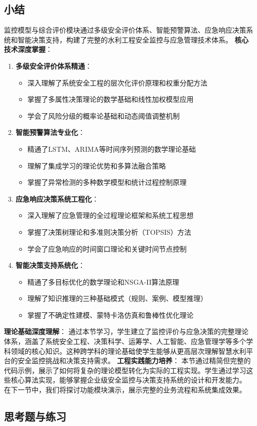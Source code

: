 \subsection{小结}\label{ux5c0fux7ed3-1} 监控模型与综合评价模块通过多级安全评价体系、智能预警算法、应急响应决策系统和智能决策支持，构建了完整的水利工程安全监控与应急管理技术体系。
\textbf{核心技术深度掌握}： \begin{enumerate} \def\labelenumi{\arabic{enumi}.} \tightlist \item \textbf{多级安全评价体系精通}：
\begin{itemize} \tightlist \item 深入理解了系统安全工程的层次化评价原理和权重分配方法 \item 掌握了多属性决策理论的数学基础和线性加权模型应用 \item 学会了风险分级的概率论基础和动态阈值调整机制
\end{itemize} \item \textbf{智能预警算法专业化}： \begin{itemize} \tightlist \item 精通了LSTM、ARIMA等时间序列预测的数学理论基础 \item
理解了集成学习的理论优势和多算法融合策略 \item 掌握了异常检测的多种数学模型和统计过程控制原理 \end{itemize} \item \textbf{应急响应决策系统工程化}： \begin{itemize} \tightlist
\item 深入理解了应急管理的全过程理论框架和系统工程思想 \item 掌握了决策树理论和多准则决策分析（TOPSIS）方法 \item 学会了应急响应的时间窗口理论和关键时间节点控制 \end{itemize} \item
\textbf{智能决策支持系统化}： \begin{itemize} \tightlist \item 精通了多目标优化的数学理论和NSGA-II算法原理 \item 理解了知识推理的三种基础模式（规则、案例、模型推理） \item
掌握了不确定性建模、蒙特卡洛仿真和鲁棒性优化理论 \end{itemize} \end{enumerate} \textbf{理论基础深度理解}：
通过本节学习，学生建立了监控评价与应急决策的完整理论体系，涵盖了系统安全工程、决策科学、运筹学、人工智能、应急管理学等多个学科领域的核心知识。这种跨学科的理论基础使学生能够从更高层次理解智慧水利平台的安全监控挑战和决策支持需求。
\textbf{工程实践能力培养}： 本节通过精简但完整的代码示例，展示了如何将复杂的理论模型转化为实际的工程实现。学生通过学习这些核心算法实现，能够掌握企业级安全监控与决策支持系统的设计和开发能力。
在下一节中，我们将探讨功能模块演示，展示完整的业务流程和系统集成效果。 \subsection{思考题与练习}\label{ux601dux8003ux9898ux4e0eux7ec3ux4e60-2}

